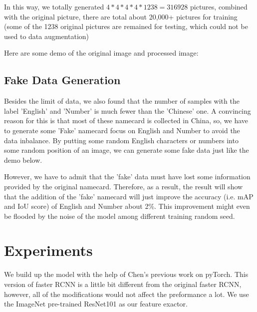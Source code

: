 \documentclass{IEEEtran}
\begin{document}
In this way, we totally generated $4 * 4 * 4 * 4 * 1238 = 316928$ pictures, combined with the original picture, there are total about 20,000+ pictures for training (some of the 1238 original pictures are remained for testing, which could not be used to data augmentation)

Here are some demo of the original image and processed image:
\begin{figure}[htp]
    \centering
\end{figure}

\subsection{Fake Data Generation}
Besides the limit of data, we also found that the number of samples with the label 'English' and 'Number' is much fewer than the 
'Chinese' one. A convincing reason for this is that most of these namecard is collected in China, so, we have to generate some 'Fake'
namecard focus on English and Number to avoid the data inbalance. By putting some random English characters or numbers into some random
position of an image, we can generate some fake data just like the demo below.

However, we have to admit that the 'fake' data must have lost some information provided by the original namecard. Therefore, as a result,
the result will show that the addition of the 'fake' namecard will just improve the accuracy (i.e. mAP and IoU score) of English and 
Number about 2\%. This improvement might even be flooded by the noise of the model among different training random seed.

\begin{figure}[htp]
    \centering
\end{figure}

\section{Experiments}
We build up the model with the help of Chen's previous work\cite{chen17implementation} on pyTorch. This version of 
faster RCNN is a little bit different from the original faster RCNN, however, all of the modifications would not 
affect the preformance a lot. We use the ImageNet pre-trained ResNet101 as our feature exactor.
\end{document}
